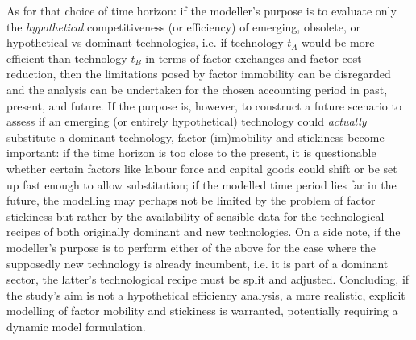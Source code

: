 As for that choice of time horizon: if the modeller's purpose is to evaluate only the \textit{hypothetical} competitiveness (or efficiency) of emerging, obsolete, or hypothetical vs dominant technologies, i.e. if technology $t_{A}$ would be more efficient than technology $t_{B}$ in terms of factor exchanges and factor cost reduction, then the limitations posed by factor immobility can be disregarded and the analysis can be undertaken for the chosen accounting period in past, present, and future.\footnotemark{} If the purpose is, however, to construct a future scenario to assess if an emerging (or entirely hypothetical) technology could \textit{actually} substitute a dominant technology, factor (im)mobility and stickiness become important: if the time horizon is too close to the present, it is questionable whether certain factors like labour force and capital goods could shift or be set up fast enough to allow substitution; if the modelled time period lies far in the future, the modelling may perhaps not be limited by the problem of factor stickiness but rather by the availability of sensible data for the technological recipes of both originally dominant and new technologies. On a side note, if the modeller's purpose is to perform either of the above for the case where the supposedly new technology is already incumbent, i.e. it is part of a dominant sector, the latter's technological recipe must be split and adjusted. Concluding, if the study's aim is not a hypothetical efficiency analysis, a more realistic, explicit modelling of factor mobility and stickiness is warranted, potentially requiring a dynamic model formulation.

